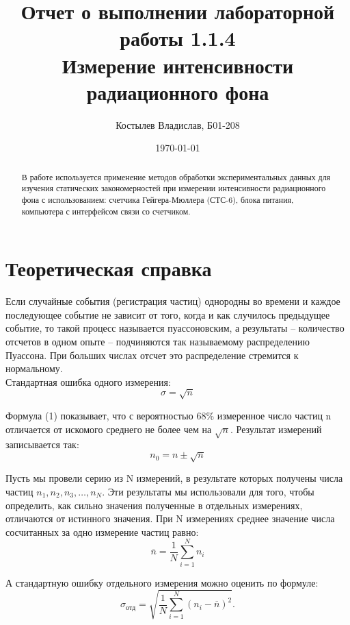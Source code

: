 \documentclass[a4paper, 12pt]{article}
\author{Костылев Владислав, Б01-208}
\date{\today}
\title{Отчет о выполнении лабораторной работы 1.1.4 \\ \textbf{Измерение интенсивности радиационного фона} }
\begin{document}
\maketitle
	
\begin{abstract}
	В работе используется применение методов обработки экспериментальных данных для изучения статических закономерностей при измерении интенсивности радиационного фона с использованием: счетчика Гейгера-Мюллера (СТС-6), блока питания, компьютера с интерфейсом связи со счетчиком.  
\end{abstract}
	
\section {Теоретическая справка} 
Если случайные события (регистрация частиц) однородны во времени и каждое последующее событие не зависит от того, когда и как случилось предыдущее событие, то такой процесс называется пуассоновским, а результаты -- количество отсчетов в одном опыте -- подчиняются так называемому распределению Пуассона. При больших числах отсчет это распределение стремится к нормальному. \\
Стандартная ошибка одного измерения:\\ 
\begin{equation}  
	\sigma = \sqrt{n}
\end{equation}

Формула (1) показывает, что с вероятностью 68\% измеренное число частиц n отличается от искомого среднего не более чем на $\sqrt{n}$. Результат измерений записывается так:\\
\begin{equation}  
	n_{0} = n \pm \sqrt{n}
\end{equation}

Пусть мы провели серию из N измерений, в результате которых получены числа частиц $n_{1}, n_{2}, n_{3}, \dots, n_{N}$. Эти результаты мы использовали для того, чтобы определить, как сильно значения полученные в отдельных измерениях, отличаются от истинного значения. При N измерениях среднее значение числа сосчитанных за одно измерение частиц равно:\\
\begin{equation}
	\overline{n} = \frac{1}{N}\sum_{i=1}^{N}n_{i}
\end{equation}
 
А стандартную ошибку отдельного измерения можно оценить по формуле:
\begin{equation}
	\sigma_{отд} = \sqrt{ \frac{1}{N} \sum_{i = 1}^{N} (n_{i} - \overline{n})^2 }.
\end{equation}  
\end{document}

